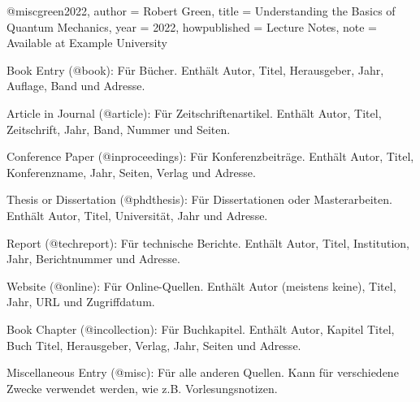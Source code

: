 @misc{green2022,
    author    = {Robert Green},
    title     = {Understanding the Basics of Quantum Mechanics},
    year      = {2022},
    howpublished = {Lecture Notes},
    note      = {Available at Example University}
}

Book Entry (@book): Für Bücher. Enthält Autor, Titel, Herausgeber, Jahr,
Auflage, Band und Adresse.

Article in Journal (@article): Für Zeitschriftenartikel. Enthält Autor, Titel,
Zeitschrift, Jahr, Band, Nummer und Seiten.

Conference Paper (@inproceedings): Für Konferenzbeiträge. Enthält Autor, Titel,
Konferenzname, Jahr, Seiten, Verlag und Adresse.

Thesis or Dissertation (@phdthesis): Für Dissertationen oder Masterarbeiten.
Enthält Autor, Titel, Universität, Jahr und Adresse.

Report (@techreport): Für technische Berichte. Enthält Autor, Titel,
Institution, Jahr, Berichtnummer und Adresse.

Website (@online): Für Online-Quellen. Enthält Autor (meistens keine), Titel,
Jahr, URL und Zugriffdatum.

Book Chapter (@incollection): Für Buchkapitel. Enthält Autor, Kapitel Titel,
Buch Titel, Herausgeber, Verlag, Jahr, Seiten und Adresse.

Miscellaneous Entry (@misc): Für alle anderen Quellen. Kann für verschiedene
Zwecke verwendet werden, wie z.B. Vorlesungsnotizen.